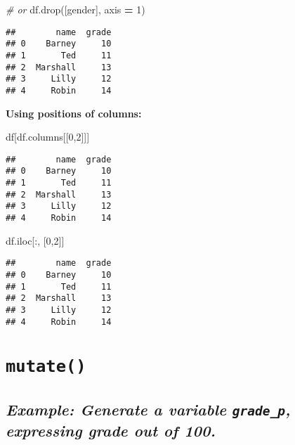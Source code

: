 \documentclass[
]{book}
\newenvironment{Shaded}{\begin{snugshade}}{\end{snugshade}}
\newcommand{\CommentTok}[1]{\textcolor[rgb]{0.56,0.35,0.01}{\textit{#1}}}
\newcommand{\DecValTok}[1]{\textcolor[rgb]{0.00,0.00,0.81}{#1}}
\newcommand{\NormalTok}[1]{#1}
\newcommand{\OperatorTok}[1]{\textcolor[rgb]{0.81,0.36,0.00}{\textbf{#1}}}
\newcommand{\StringTok}[1]{\textcolor[rgb]{0.31,0.60,0.02}{#1}}
\begin{document}
\begin{Shaded}
\begin{Highlighting}[]
\CommentTok{\# or}
\NormalTok{df.drop([}\StringTok{\textquotesingle{}gender\textquotesingle{}}\NormalTok{], axis }\OperatorTok{=} \DecValTok{1}\NormalTok{)}
\end{Highlighting}
\end{Shaded}

\begin{verbatim}
##        name  grade
## 0    Barney     10
## 1       Ted     11
## 2  Marshall     13
## 3     Lilly     12
## 4     Robin     14
\end{verbatim}

\textbf{Using positions of columns:}

\begin{Shaded}
\begin{Highlighting}[]
\NormalTok{df[df.columns[[}\DecValTok{0}\NormalTok{,}\DecValTok{2}\NormalTok{]]]}
\end{Highlighting}
\end{Shaded}

\begin{verbatim}
##        name  grade
## 0    Barney     10
## 1       Ted     11
## 2  Marshall     13
## 3     Lilly     12
## 4     Robin     14
\end{verbatim}

\begin{Shaded}
\begin{Highlighting}[]
\NormalTok{df.iloc[:, [}\DecValTok{0}\NormalTok{,}\DecValTok{2}\NormalTok{]]}
\end{Highlighting}
\end{Shaded}

\begin{verbatim}
##        name  grade
## 0    Barney     10
## 1       Ted     11
## 2  Marshall     13
## 3     Lilly     12
## 4     Robin     14
\end{verbatim}

\hypertarget{mutate}{%
\section{\texorpdfstring{\texttt{mutate()}}{mutate()}}\label{mutate}}

\hypertarget{example-generate-a-variable-grade_p-expressing-grade-out-of-100.}{%
\subsection{\texorpdfstring{\emph{Example: Generate a variable \texttt{grade\_p}, expressing grade out of 100.}}{Example: Generate a variable grade\_p, expressing grade out of 100.}}\label{example-generate-a-variable-grade_p-expressing-grade-out-of-100.}}
\end{document}
